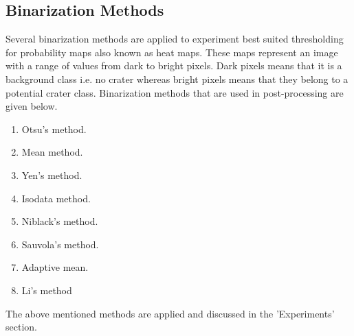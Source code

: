 \documentclass[11pt]{article}
\begin{document}
\subsection{Binarization Methods}
Several binarization methods are applied to experiment best suited thresholding for probability maps also known as heat maps. These maps represent an image with a range of values from dark to bright pixels. Dark pixels means that it is a background class i.e. no crater whereas bright pixels means that they belong to a potential crater class. Binarization methods that are used in post-processing are given below.

\begin{enumerate}
	\item Otsu's method.
	\item Mean method.
	\item Yen's method.
	\item Isodata method.
	\item Niblack's method.
	\item Sauvola's method.
	\item Adaptive mean.
	\item Li's method
\end{enumerate}

The above mentioned methods are applied and discussed in the 'Experiments' section.
%
%
\end{document}
